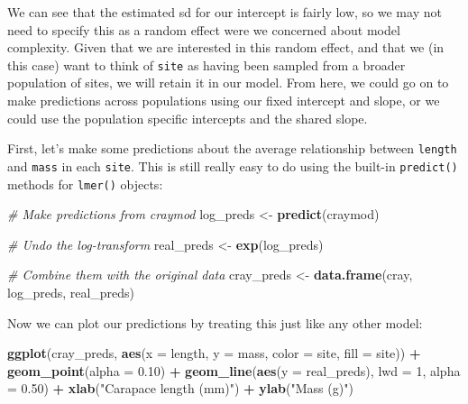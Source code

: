 \documentclass[
]{book}
\newenvironment{Shaded}{\begin{snugshade}}{\end{snugshade}}
\newcommand{\CommentTok}[1]{\textcolor[rgb]{0.56,0.35,0.01}{\textit{#1}}}
\newcommand{\DataTypeTok}[1]{\textcolor[rgb]{0.13,0.29,0.53}{#1}}
\newcommand{\DecValTok}[1]{\textcolor[rgb]{0.00,0.00,0.81}{#1}}
\newcommand{\FloatTok}[1]{\textcolor[rgb]{0.00,0.00,0.81}{#1}}
\newcommand{\KeywordTok}[1]{\textcolor[rgb]{0.13,0.29,0.53}{\textbf{#1}}}
\newcommand{\NormalTok}[1]{#1}
\newcommand{\OperatorTok}[1]{\textcolor[rgb]{0.81,0.36,0.00}{\textbf{#1}}}
\newcommand{\StringTok}[1]{\textcolor[rgb]{0.31,0.60,0.02}{#1}}
\begin{document}
We can see that the estimated sd for our intercept is fairly low, so we may not need to specify this as a random effect were we concerned about model complexity. Given that we are interested in this random effect, and that we (in this case) want to think of \texttt{site} as having been sampled from a broader population of sites, we will retain it in our model. From here, we could go on to make predictions across populations using our fixed intercept and slope, or we could use the population specific intercepts and the shared slope.

First, let's make some predictions about the average relationship between \texttt{length} and \texttt{mass} in each \texttt{site}. This is still really easy to do using the built-in \texttt{predict()} methods for \texttt{lmer()} objects:

\begin{Shaded}
\begin{Highlighting}[]
\CommentTok{# Make predictions from craymod}
\NormalTok{log_preds <-}\StringTok{ }\KeywordTok{predict}\NormalTok{(craymod)}

\CommentTok{# Undo the log-transform}
\NormalTok{real_preds <-}\StringTok{ }\KeywordTok{exp}\NormalTok{(log_preds)}

\CommentTok{# Combine them with the original data}
\NormalTok{cray_preds <-}\StringTok{ }\KeywordTok{data.frame}\NormalTok{(cray, log_preds, real_preds)}
\end{Highlighting}
\end{Shaded}

Now we can plot our predictions by treating this just like any other model:

\begin{Shaded}
\begin{Highlighting}[]
\KeywordTok{ggplot}\NormalTok{(cray_preds, }\KeywordTok{aes}\NormalTok{(}\DataTypeTok{x =}\NormalTok{ length, }\DataTypeTok{y =}\NormalTok{ mass, }\DataTypeTok{color =}\NormalTok{ site, }\DataTypeTok{fill =}\NormalTok{ site)) }\OperatorTok{+}
\StringTok{  }\KeywordTok{geom_point}\NormalTok{(}\DataTypeTok{alpha =} \FloatTok{0.10}\NormalTok{) }\OperatorTok{+}
\StringTok{  }\KeywordTok{geom_line}\NormalTok{(}\KeywordTok{aes}\NormalTok{(}\DataTypeTok{y =}\NormalTok{ real_preds), }\DataTypeTok{lwd =} \DecValTok{1}\NormalTok{, }\DataTypeTok{alpha =} \FloatTok{0.50}\NormalTok{) }\OperatorTok{+}
\StringTok{  }\KeywordTok{xlab}\NormalTok{(}\StringTok{"Carapace length (mm)"}\NormalTok{) }\OperatorTok{+}
\StringTok{  }\KeywordTok{ylab}\NormalTok{(}\StringTok{"Mass (g)"}\NormalTok{)}
\end{Highlighting}
\end{Shaded}
\end{document}
